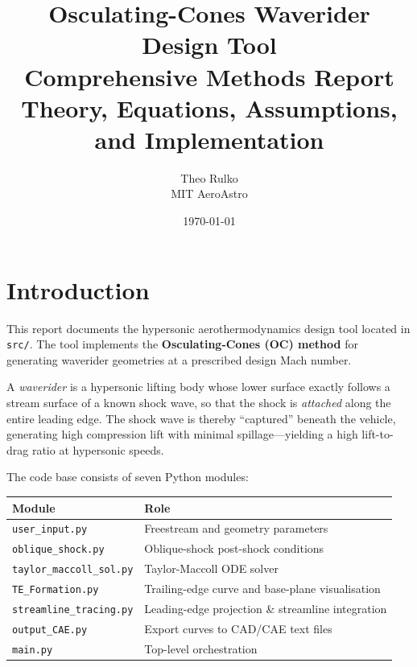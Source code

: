 \documentclass[12pt,a4paper]{article}
\title{%
    \textbf{Osculating-Cones Waverider Design Tool}\\[0.5em]
    \large Comprehensive Methods Report\\[0.3em]
    \normalsize Theory, Equations, Assumptions, and Implementation
}
\author{Theo Rulko\\[0.3em]
        \small MIT AeroAstro}
\date{\today}
\begin{document}
\maketitle
\tableofcontents
\newpage

\section{Introduction}
\label{sec:intro}

This report documents the hypersonic aerothermodynamics design tool located in
\texttt{src/}.  The tool implements the \textbf{Osculating-Cones (OC) method} for
generating waverider geometries at a prescribed design Mach number.

A \emph{waverider} is a hypersonic lifting body whose lower surface exactly
follows a stream surface of a known shock wave, so that the shock is
\emph{attached} along the entire leading edge.  The shock wave is thereby
``captured'' beneath the vehicle, generating high compression lift with minimal
spillage---yielding a high lift-to-drag ratio at hypersonic speeds.

The code base consists of seven Python modules:

\begin{center}
\begin{tabular}{ll}
\toprule
Module & Role \\
\midrule
\texttt{user\_input.py}         & Freestream and geometry parameters \\
\texttt{oblique\_shock.py}      & Oblique-shock post-shock conditions\\
\texttt{taylor\_maccoll\_sol.py}& Taylor-Maccoll ODE solver \\
\texttt{TE\_Formation.py}       & Trailing-edge curve and base-plane visualisation \\
\texttt{streamline\_tracing.py} & Leading-edge projection \& streamline integration \\
\texttt{output\_CAE.py}         & Export curves to CAD/CAE text files \\
\texttt{main.py}                & Top-level orchestration \\
\bottomrule
\end{tabular}
\end{center}

\end{document}
